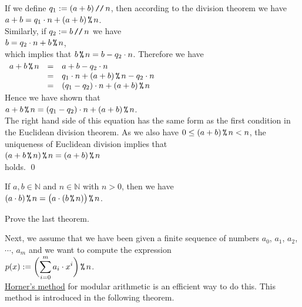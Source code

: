 \proof
If we define $q_1 := (a + b) \,\texttt{//}\, n$, then according to the division theorem we have 
\\[0.2cm]
\hspace*{1.3cm}
$a + b = q_1 \cdot n + (a + b) \,\texttt{\%}\, n$. 
\\[0.2cm]
Similarly, if $q_2 := b \,\texttt{//}\, n$ we have
\\[0.2cm]
\hspace*{1.3cm}
$b = q_2 \cdot n + b \,\texttt{\%}\, n$,
\\[0.2cm]
which implies that $b \,\texttt{\%}\, n = b - q_2 \cdot n$.
Therefore we have
\\[0.2cm]
\hspace*{1.3cm}
$
\begin{array}[t]{lcl}
  a + b \,\texttt{\%}\, n & = & a + b - q_2 \cdot n \\
                & = & q_1 \cdot n + (a + b) \,\texttt{\%}\, n - q_2 \cdot n \\
                & = & (q_1 - q_2) \cdot n + (a + b) \,\texttt{\%}\, n
\end{array}
$
\\[0.2cm]
Hence we have shown that
\\[0.2cm]
\hspace*{1.3cm}
$a + b \,\texttt{\%}\, n = (q_1 - q_2) \cdot n + (a + b) \,\texttt{\%}\, n$.
\\[0.2cm]
The right hand side of this equation has the same form as the first condition in the Euclidean division theorem.
As we also have $0 \leq (a + b) \,\texttt{\%}\, n < n$, the uniqueness of Euclidean division implies that
\\[0.2cm]
\hspace*{1.3cm}
$(a + b \,\texttt{\%}\, n) \,\texttt{\%}\, n = (a + b) \,\texttt{\%}\, n$
\\[0.2cm]
holds.  \qed

\begin{Theorem} \lb
  If $a, b \in \mathbb{N}$ and $n \in \mathbb{N}$ with $n > 0$, then we have
  \\[0.2cm]
  \hspace*{1.3cm}
  $\displaystyle (a \cdot b) \,\texttt{\%}\, n = \bigl(a \cdot (b \,\texttt{\%}\, n)\bigr) \,\texttt{\%}\, n$.
\end{Theorem}

\exercise
Prove the last theorem. \eox

Next, we assume that we have been given a finite sequence of numbers $a_0$, $a_1$, $a_2$, $\cdots$, $a_m$  and we want to compute the expression
\\[0.2cm]
\hspace*{1.3cm}
$\displaystyle p(x) := \biggl(\sum\limits_{i=0}^m a_i \cdot x^i\biggr) \,\texttt{\%}\, n$.
\\[0.2cm]
\href{https://en.wikipedia.org/wiki/Horner%27s_method}{Horner's method}
for modular arithmetic is an efficient way to do this.  This method is introduced in the following theorem.

